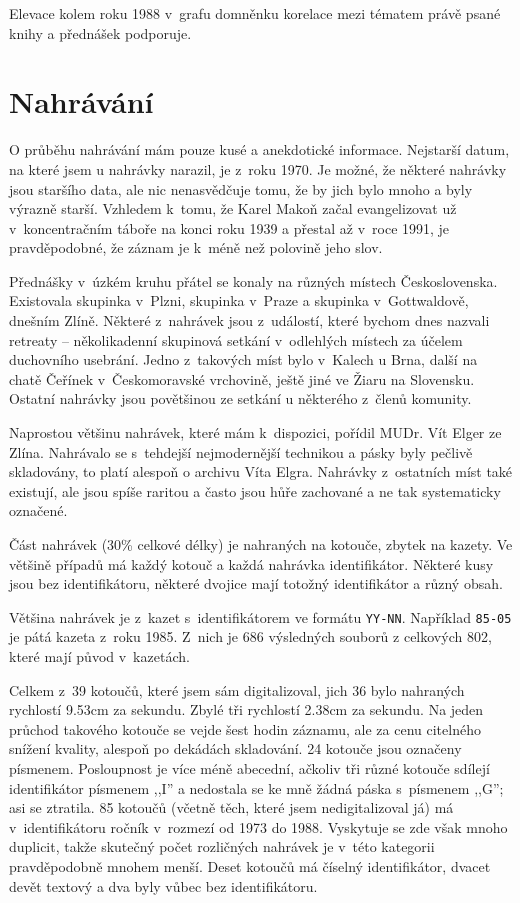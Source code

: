 Elevace kolem roku 1988 v~grafu domněnku korelace mezi tématem právě psané knihy
a přednášek podporuje.

\section{Nahrávání}

O průběhu nahrávání mám pouze kusé a anekdotické informace. Nejstarší datum, na
které jsem u nahrávky narazil, je z~roku 1970. Je možné, že některé nahrávky
jsou staršího data, ale nic nenasvědčuje tomu, že by jich bylo mnoho a byly
výrazně starší. Vzhledem k~tomu, že Karel Makoň začal evangelizovat už
v~koncentračním táboře na konci roku 1939 a přestal až v~roce 1991, je
pravděpodobné, že záznam je k~méně než polovině jeho slov.

Přednášky v~úzkém kruhu přátel se konaly na různých místech Československa.
Existovala skupinka v~Plzni, skupinka v~Praze a skupinka v~Gottwaldově, dnešním
Zlíně. Některé z~nahrávek jsou z~událostí, které bychom dnes nazvali retreaty --
několikadenní skupinová setkání v~odlehlých místech za účelem duchovního
usebrání. Jedno z~takových míst bylo v~Kalech u Brna, další na chatě Čeřínek
v~Českomoravské vrchovině, ještě jiné ve Žiaru na Slovensku. Ostatní nahrávky
jsou povětšinou ze setkání u některého z~členů komunity.

Naprostou většinu nahrávek, které mám k~dispozici, pořídil MUDr. Vít Elger ze
Zlína. Nahrávalo se s~tehdejší nejmodernější technikou a pásky byly pečlivě
skladovány, to platí alespoň o archivu Víta Elgra. Nahrávky z~ostatních míst
také existují, ale jsou spíše raritou a často jsou hůře zachované a ne tak
systematicky označené.

Část nahrávek (30\% celkové délky) je nahraných na kotouče, zbytek na kazety. Ve
většině případů má každý kotouč a každá nahrávka identifikátor. Některé kusy
jsou bez identifikátoru, některé dvojice mají totožný identifikátor a různý
obsah.

Většina nahrávek je z~kazet s~identifikátorem ve formátu \texttt{YY-NN}.
Například \texttt{85-05} je pátá kazeta z~roku 1985. Z~nich je 686
výsledných souborů z celkových 802, které mají původ v~kazetách.

Celkem z~39 kotoučů, které jsem sám digitalizoval, jich 36 bylo nahraných
rychlostí 9.53cm za sekundu. Zbylé tři rychlostí 2.38cm za sekundu. Na jeden
průchod takového kotouče se vejde šest hodin záznamu, ale za cenu citelného
snížení kvality, alespoň po dekádách skladování. 24 kotouče jsou označeny
písmenem. Posloupnost je více méně abecední, ačkoliv tři různé kotouče sdílejí
identifikátor písmenem ,,I'' a nedostala se ke mně žádná páska s~písmenem
,,G''; asi se ztratila. 85 kotoučů (včetně těch, které jsem nedigitalizoval já)
má v~identifikátoru ročník v~rozmezí od 1973 do 1988. Vyskytuje se zde však
mnoho duplicit, takže skutečný počet rozličných nahrávek je v~této kategorii
pravděpodobně mnohem menší. Deset kotoučů má číselný identifikátor, dvacet devět
textový a dva byly vůbec bez identifikátoru.

